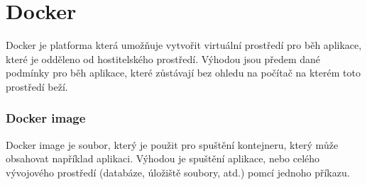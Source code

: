 \chapter{Docker}
Docker je platforma která umožňuje vytvořit virtuální prostředí pro 
běh aplikace, které je odděleno od hostitelského prostředí.
Výhodou jsou předem dané podmínky pro běh aplikace, které zůstávají
bez ohledu na počítač na kterém toto prostředí beží. 
\subsection{Docker image}
Docker image je soubor, který je použit pro spuštění kontejneru, který
může obsahovat například aplikaci. Výhodou je spuštění aplikace,
nebo celého vývojového prostředí (databáze, úložiště soubory, atd.) pomcí
jednoho příkazu.